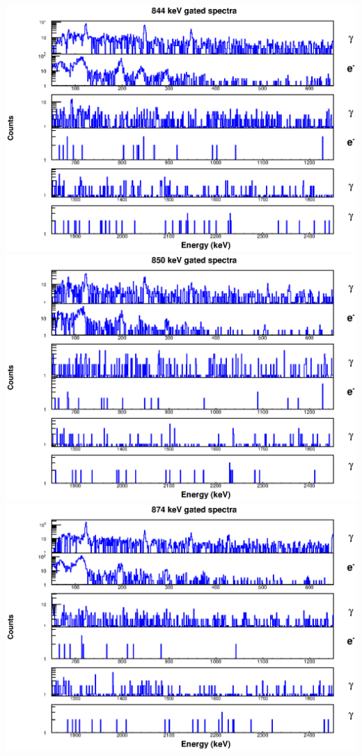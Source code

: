 \begin{landscape}
\includegraphics[scale=1.1]{154Gd_Appendix/844_combined.eps}
\includegraphics[scale=1.1]{154Gd_Appendix/850_combined.eps}
\includegraphics[scale=1.1]{154Gd_Appendix/874_combined.eps}

\end{landscape}
